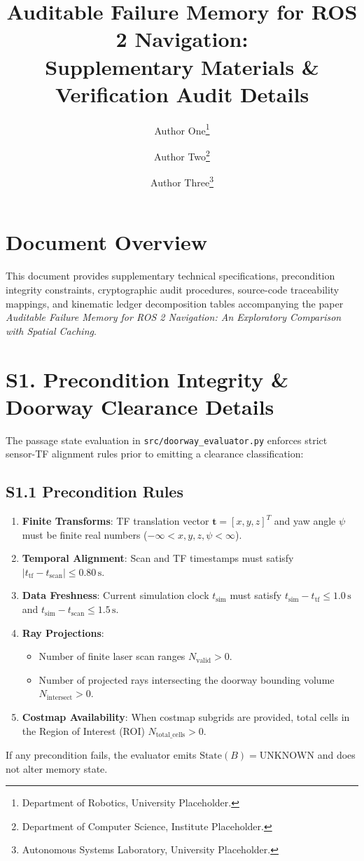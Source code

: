 \documentclass[10pt]{article}
\title{Auditable Failure Memory for ROS 2 Navigation:\\Supplementary Materials \& Verification Audit Details}
\author{
    Author One\thanks{Department of Robotics, University Placeholder.}
    \and
    Author Two\thanks{Department of Computer Science, Institute Placeholder.}
    \and
    Author Three\thanks{Autonomous Systems Laboratory, University Placeholder.}
}
\date{}
\begin{document}
\maketitle

\section*{Document Overview}
This document provides supplementary technical specifications, precondition integrity constraints, cryptographic audit procedures, source-code traceability mappings, and kinematic ledger decomposition tables accompanying the paper \emph{Auditable Failure Memory for ROS 2 Navigation: An Exploratory Comparison with Spatial Caching}.

\section{S1. Precondition Integrity \& Doorway Clearance Details}
The passage state evaluation in \texttt{src/doorway\_evaluator.py} enforces strict sensor-TF alignment rules prior to emitting a clearance classification:

\subsection{S1.1 Precondition Rules}
\begin{enumerate}
    \item \textbf{Finite Transforms}: TF translation vector $\mathbf{t} = [x, y, z]^T$ and yaw angle $\psi$ must be finite real numbers ($-\infty < x, y, z, \psi < \infty$).
    \item \textbf{Temporal Alignment}: Scan and TF timestamps must satisfy $|t_{\text{tf}} - t_{\text{scan}}| \le 0.80\,\text{s}$.
    \item \textbf{Data Freshness}: Current simulation clock $t_{\text{sim}}$ must satisfy $t_{\text{sim}} - t_{\text{tf}} \le 1.0\,\text{s}$ and $t_{\text{sim}} - t_{\text{scan}} \le 1.5\,\text{s}$.
    \item \textbf{Ray Projections}:
    \begin{itemize}
        \item Number of finite laser scan ranges $N_{\text{valid}} > 0$.
        \item Number of projected rays intersecting the doorway bounding volume $N_{\text{intersect}} > 0$.
    \end{itemize}
    \item \textbf{Costmap Availability}: When costmap subgrids are provided, total cells in the Region of Interest (ROI) $N_{\text{total\_cells}} > 0$.
\end{enumerate}
If any precondition fails, the evaluator emits $\text{State}(B) = \text{UNKNOWN}$ and does not alter memory state.
\end{document}
